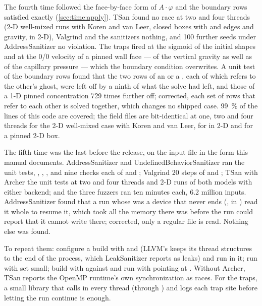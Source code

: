 The fourth time followed the face-by-face form of $A\cdot\varphi$ and the
boundary rows satisfied exactly (\cref{sec:time:apply}). TSan found no race
at two and four threads (2-D well-mixed runs with Koren and van Leer, closed
boxes with  and  edges and gravity, 
in 2-D), Valgrind and the sanitizers nothing, and 100 further 
seeds under AddressSanitizer no violation. The traps fired at the sigmoid of
the initial shapes and at the 0/0 velocity of a pinned wall face --- of the
vertical gravity as well as of the capillary pressure --- which the boundary
condition overwrites. A unit test of the boundary rows found that the two
rows of an  or a , each of which refers to
the other's ghost, were left off by a ninth of what the solve had left, and
those of a 1-D pinned concentration 729 times further off; corrected, each
set of rows that refer to each other is solved together, which changes no
shipped case. \SI{99}{\percent} of the lines of this code are covered; the
field files are bit-identical at one, two and four threads for the 2-D
well-mixed case with Koren and van Leer, for  in 2-D and for a
pinned 2-D box.

The fifth time was the last before the release, on the input file in the form
this manual documents. AddressSanitizer and UndefinedBehaviorSanitizer ran
the unit tests, , ,
,  and nine checks each of
 and ; Valgrind 20 steps of
 and ; TSan with Archer the unit
tests at two and four threads and 2-D runs of both models with either backend;
and the three fuzzers ran ten minutes each, 6.2 million inputs. AddressSanitizer
found that a run whose  was a device that never ends
(, in ) read it whole to resume it, which
took all the memory there was before the run could report that it cannot
write there; corrected, only a regular file is read. Nothing else was found.

To repeat them: configure a build with
 and
 (LLVM's  keeps its thread
structures to the end of the process, which LeakSanitizer reports as leaks)
and run  in it; run  with
 set small; build with  against  and run with
 pointing at . Without Archer,
TSan reports the OpenMP runtime's own synchronization as races. For the
traps, a small  library that calls 
in every thread (through ) and logs each trap site
before letting the run continue is enough.


